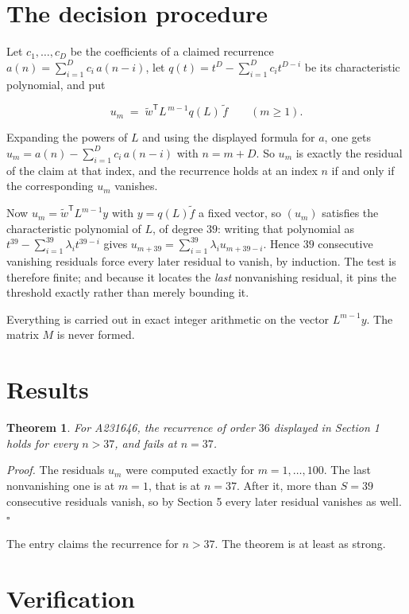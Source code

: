\documentclass[11pt]{article}
\newtheorem{theorem}{Theorem}
\theoremstyle{definition}
\begin{document}
\section{The decision procedure}

Let $c_1,\dots,c_D$ be the coefficients of a claimed recurrence $a(n) = \sum_{i=1}^{D} c_i\,a(n-i)$, let $q(t) = t^{D} - \sum_{i=1}^{D} c_i t^{D-i}$ be its characteristic polynomial, and put

\[u_m \;=\; \tilde w^{\mathsf T} L^{\,m-1} q(L)\,\tilde f \qquad (m \ge 1).\]

Expanding the powers of $L$ and using the displayed formula for $a$, one gets $u_m = a(n) - \sum_{i=1}^{D} c_i\,a(n-i)$ with $n = m + D$. So $u_m$ is exactly the residual of the claim at that index, and the recurrence holds at an index $n$ if and only if the corresponding $u_m$ vanishes.

Now $u_m = \tilde w^{\mathsf T} L^{m-1} y$ with $y = q(L)\tilde f$ a fixed vector, so $(u_m)$ satisfies the characteristic polynomial of $L$, of degree $39$: writing that polynomial as $t^{39} - \sum_{i=1}^{39} \lambda_i t^{39-i}$ gives $u_{m+39} = \sum_{i=1}^{39} \lambda_i u_{m+39-i}$. Hence $39$ consecutive vanishing residuals force every later residual to vanish, by induction. The test is therefore finite; and because it locates the {\itshape last} nonvanishing residual, it pins the threshold exactly rather than merely bounding it.

Everything is carried out in exact integer arithmetic on the vector $L^{m-1}y$. The matrix $M$ is never formed.

\section{Results}

\begin{theorem} For A231646, the recurrence of order $36$ displayed in Section 1 holds for every $n > 37$, and fails at $n = 37$.\end{theorem}

{\itshape Proof.} The residuals $u_m$ were computed exactly for $m = 1,\dots,100$. The last nonvanishing one is at $m = 1$, that is at $n = 37$. After it, more than $S = 39$ consecutive residuals vanish, so by Section 5 every later residual vanishes as well. $\square$

The entry claims the recurrence for $n > 37$. The theorem is at least as strong.

\section{Verification}
\end{document}
